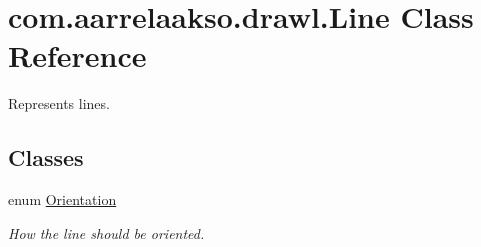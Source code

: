 \hypertarget{classcom_1_1aarrelaakso_1_1drawl_1_1_line}{}\section{com.\+aarrelaakso.\+drawl.\+Line Class Reference}
\label{classcom_1_1aarrelaakso_1_1drawl_1_1_line}


Represents lines.  


\subsection*{Classes}
\begin{DoxyCompactItemize}
\item 
enum \hyperlink{enumcom_1_1aarrelaakso_1_1drawl_1_1_line_1_1_orientation}{Orientation}
\begin{DoxyCompactList}\small\item\em How the line should be oriented. \end{DoxyCompactList}\end{DoxyCompactItemize}
